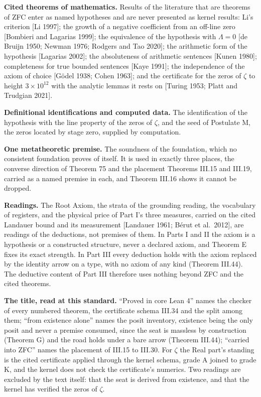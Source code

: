 \documentclass[10pt]{article}
\begin{document}
\textbf{Cited theorems of mathematics.} Results of the literature that
are theorems of ZFC enter as named hypotheses and are never presented as
kernel results: Li's criterion {[}Li 1997{]}; the growth of a negative
coefficient from an off-line zero {[}Bombieri and Lagarias 1999{]}; the
equivalence of the hypothesis with \(\Lambda = 0\) {[}de Bruijn 1950;
Newman 1976; Rodgers and Tao 2020{]}; the arithmetic form of the
hypothesis {[}Lagarias 2002{]}; the absoluteness of arithmetic sentences
{[}Kunen 1980{]}; completeness for true bounded sentences {[}Kaye
1991{]}; the independence of the axiom of choice {[}Gödel 1938; Cohen
1963{]}; and the certificate for the zeros of \(\zeta\) to height
\(3 \times 10^{12}\) with the analytic lemmas it rests on {[}Turing
1953; Platt and Trudgian 2021{]}.

\textbf{Definitional identifications and computed data.} The
identification of the hypothesis with the line property of the zeros of
\(\zeta\), and the seed of Postulate M, the zeros located by stage zero,
supplied by computation.

\textbf{One metatheoretic premise.} The soundness of the foundation,
which no consistent foundation proves of itself. It is used in exactly
three places, the converse direction of Theorem 75 and the placement
Theorems III.15 and III.19, carried as a named premise in each, and
Theorem III.16 shows it cannot be dropped.

\textbf{Readings.} The Root Axiom, the strata of the grounding reading,
the vocabulary of registers, and the physical price of Part I's three
measures, carried on the cited Landauer bound and its measurement
{[}Landauer 1961; Bérut et al.~2012{]}, are readings of the deductions,
not premises of them. In Parts I and II the axiom is a hypothesis or a
constructed structure, never a declared axiom, and Theorem E fixes its
exact strength. In Part III every deduction holds with the axiom
replaced by the identity arrow on a type, with no axiom of any kind
(Theorem III.44). The deductive content of Part III therefore uses
nothing beyond ZFC and the cited theorems.

\textbf{The title, read at this standard.} ``Proved in core Lean 4''
names the checker of every numbered theorem, the certificate schema
III.34 and the split among them; ``from existence alone'' names the
posit inventory, existence being the only posit and never a premise
consumed, since the seat is massless by construction (Theorem G) and the
road holds under a bare arrow (Theorem III.44); ``carried into ZFC''
names the placement of III.15 to III.30. For \(\zeta\) the Real part's
standing is the cited certificate applied through the kernel schema,
grade A joined to grade K, and the kernel does not check the
certificate's numerics. Two readings are excluded by the text itself:
that the seat is derived from existence, and that the kernel has
verified the zeros of \(\zeta\).
\end{document}
